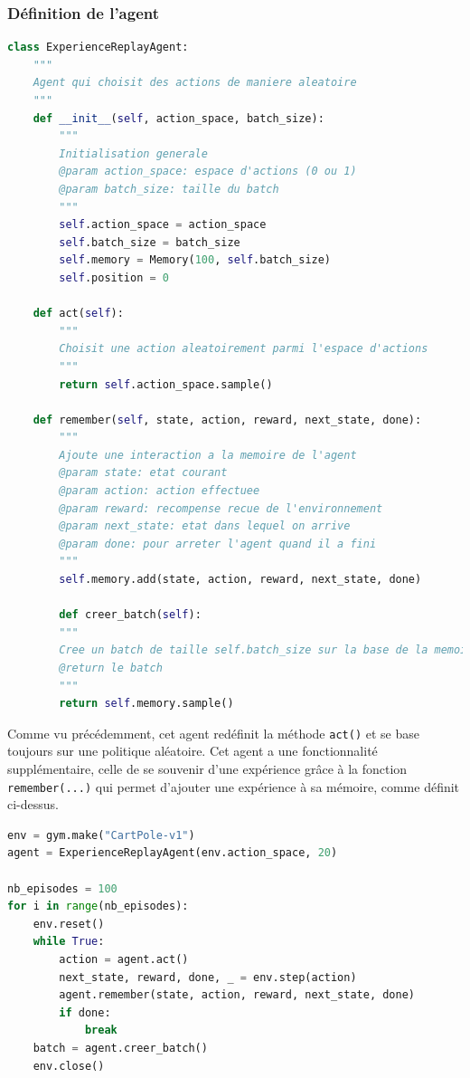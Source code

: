 \documentclass[10pt,a4paper]{article}
\begin{document}
\subsubsection{Définition de l'agent}

\begin{lstlisting}[language=Python, caption=Implémentation de l'agent utilisant son expérience]
class ExperienceReplayAgent:
    """
    Agent qui choisit des actions de maniere aleatoire
    """
    def __init__(self, action_space, batch_size):
        """
        Initialisation generale
        @param action_space: espace d'actions (0 ou 1)
        @param batch_size: taille du batch
        """
        self.action_space = action_space
        self.batch_size = batch_size
        self.memory = Memory(100, self.batch_size)
        self.position = 0
        
    def act(self):
        """
        Choisit une action aleatoirement parmi l'espace d'actions
        """
        return self.action_space.sample()

    def remember(self, state, action, reward, next_state, done):
        """
        Ajoute une interaction a la memoire de l'agent
        @param state: etat courant
        @param action: action effectuee
        @param reward: recompense recue de l'environnement
        @param next_state: etat dans lequel on arrive
        @param done: pour arreter l'agent quand il a fini
        """
        self.memory.add(state, action, reward, next_state, done)

        def creer_batch(self):
        """
        Cree un batch de taille self.batch_size sur la base de la memoire
        @return le batch
        """
        return self.memory.sample()
\end{lstlisting}

Comme vu précédemment, cet agent redéfinit la méthode \lstinline{act()} et se base toujours sur une politique aléatoire. Cet agent a une fonctionnalité supplémentaire, celle de se souvenir d'une expérience grâce à la fonction \lstinline{remember(...)} qui permet d'ajouter une expérience à sa mémoire, comme définit ci-dessus.

\begin{lstlisting}[language=Python, caption=Programme principal de l'agent utilisant l'expérience replay]
env = gym.make("CartPole-v1") 
agent = ExperienceReplayAgent(env.action_space, 20)

nb_episodes = 100
for i in range(nb_episodes):
    env.reset()
    while True:
        action = agent.act()
        next_state, reward, done, _ = env.step(action)
        agent.remember(state, action, reward, next_state, done)
        if done:
            break
    batch = agent.creer_batch()
    env.close()
\end{lstlisting}
\end{document}
